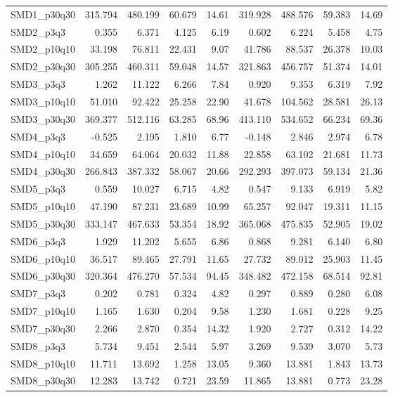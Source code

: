 \begin{longtable}{lrrrrrrrr}
SMD1\_p30q30 & 315.794 & 480.199 & 60.679 & 14.61 & 319.928 & 488.576 & 59.383 & 14.69 \\
SMD2\_p3q3 & 0.355 & 6.371 & 4.125 & 6.19 & 0.602 & 6.224 & 5.458 & 4.75 \\
SMD2\_p10q10 & 33.198 & 76.811 & 22.431 & 9.07 & 41.786 & 88.537 & 26.378 & 10.03 \\
SMD2\_p30q30 & 305.255 & 460.311 & 59.048 & 14.57 & 321.863 & 456.757 & 51.374 & 14.01 \\
SMD3\_p3q3 & 1.262 & 11.122 & 6.266 & 7.84 & 0.920 & 9.353 & 6.319 & 7.92 \\
SMD3\_p10q10 & 51.010 & 92.422 & 25.258 & 22.90 & 41.678 & 104.562 & 28.581 & 26.13 \\
SMD3\_p30q30 & 369.377 & 512.116 & 63.285 & 68.96 & 413.110 & 534.652 & 66.234 & 69.36 \\
SMD4\_p3q3 & -0.525 & 2.195 & 1.810 & 6.77 & -0.148 & 2.846 & 2.974 & 6.78 \\
SMD4\_p10q10 & 34.659 & 64.064 & 20.032 & 11.88 & 22.858 & 63.102 & 21.681 & 11.73 \\
SMD4\_p30q30 & 266.843 & 387.332 & 58.067 & 20.66 & 292.293 & 397.073 & 59.134 & 21.36 \\
SMD5\_p3q3 & 0.559 & 10.027 & 6.715 & 4.82 & 0.547 & 9.133 & 6.919 & 5.82 \\
SMD5\_p10q10 & 47.190 & 87.231 & 23.689 & 10.99 & 65.257 & 92.047 & 19.311 & 11.15 \\
SMD5\_p30q30 & 333.147 & 467.633 & 53.354 & 18.92 & 365.068 & 475.835 & 52.905 & 19.02 \\
SMD6\_p3q3 & 1.929 & 11.202 & 5.655 & 6.86 & 0.868 & 9.281 & 6.140 & 6.80 \\
SMD6\_p10q10 & 36.517 & 89.465 & 27.791 & 11.65 & 27.732 & 89.012 & 25.903 & 11.45 \\
SMD6\_p30q30 & 320.364 & 476.270 & 57.534 & 94.45 & 348.482 & 472.158 & 68.514 & 92.81 \\
SMD7\_p3q3 & 0.202 & 0.781 & 0.324 & 4.82 & 0.297 & 0.889 & 0.280 & 6.08 \\
SMD7\_p10q10 & 1.165 & 1.630 & 0.204 & 9.58 & 1.230 & 1.681 & 0.228 & 9.25 \\
SMD7\_p30q30 & 2.266 & 2.870 & 0.354 & 14.32 & 1.920 & 2.727 & 0.312 & 14.22 \\
SMD8\_p3q3 & 5.734 & 9.451 & 2.544 & 5.97 & 3.269 & 9.539 & 3.070 & 5.73 \\
SMD8\_p10q10 & 11.711 & 13.692 & 1.258 & 13.05 & 9.360 & 13.881 & 1.843 & 13.73 \\
SMD8\_p30q30 & 12.283 & 13.742 & 0.721 & 23.59 & 11.865 & 13.881 & 0.773 & 23.28 \\

\end{longtable}
